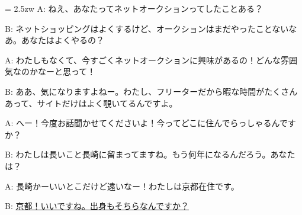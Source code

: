 \documentclass[11pt]{amsart}
\title{}
\author{}
\newenvironment{hangall}[1]{\hangindent = 2.5zw\everypar{\hangindent = 2.5zw}}{}
\begin{document}
\maketitle
\begin{hangall}{}%
A: ねえ、あなたってネットオークションってしたことある？

B: ネットショッピングはよくするけど、オークションはまだやったことないなあ。あなたはよくやるの？

A: わたしもなくて、今すごくネットオークションに興味があるの！どんな雰囲気なのかなーと思って！

B: ああ、気になりますよねー。わたし、フリーターだから暇な時間がたくさんあって、サイトだけはよく覗いてるんですよ。

A: へー！今度お話聞かせてくださいよ！今ってどこに住んでらっしゃるんですか？

B: わたしは長いこと長崎に留まってますね。もう何年になるんだろう。あなたは？

A: 長崎かーいいとこだけど遠いなー！わたしは京都在住です。

B: \ul{京都！いいですね。出身もそちらなんですか？}\end{hangall}
\end{document}
